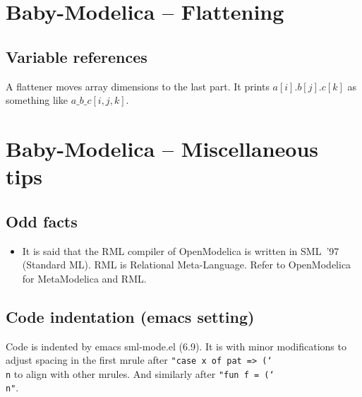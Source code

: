 \documentclass[10pt,b5paper]{article}
\begin{document}
\section{Baby-Modelica -- Flattening}

\subsection{Variable references}

A flattener moves array dimensions to the last part.  It prints
$a[i].b[j].c[k]$ as something like $a\_b\_c[i,j,k]$.


\section{Baby-Modelica -- Miscellaneous tips}

\subsection{Odd facts}

\begin{itemize}

\item It is said that the RML compiler of OpenModelica is written in
SML~'97 (Standard ML).  RML is Relational Meta-Language.  Refer to
OpenModelica for MetaModelica and RML.

\end{itemize}

\subsection{Code indentation (emacs setting)}

Code is indented by emacs sml-mode.el (6.9).  It is with minor
modifications to adjust spacing in the first mrule after
{\tt{}"case~x~of~pat~=>~({\char`\\}n} to align with other mrules.  And
similarly after {\tt{}"fun~f~=~({\char`\\}n"}.
\end{document}
